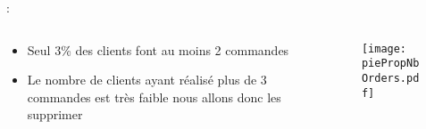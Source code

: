 \documentclass[8pt,aspectratio=169,hyperref={unicode=true}]{beamer}
\begin{document}
\begin{frame}{\insertsection: \insertsubsection}
    \begin{columns}
        \begin{column}{.45\textwidth}
            \begin{itemize}
                \item Seul 3\% des clients font au moins 2 commandes
            \end{itemize}
            
            \begin{itemize}
                \item Le nombre de clients ayant réalisé plus de 3 commandes est très faible nous allons donc les supprimer
            \end{itemize}
        \end{column}
        \begin{column}{.55\textwidth}
            \begin{figure}
                \texttt{[image: piePropNbOrders.pdf]}
            \end{figure}
        \end{column}
    \end{columns}
\end{frame}
\end{document}
